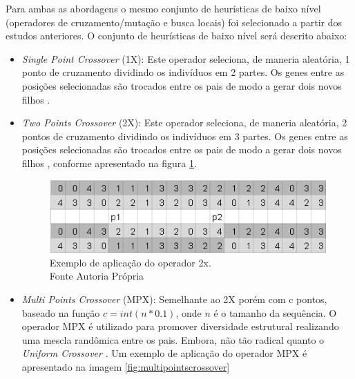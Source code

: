 Para ambas as abordagens o mesmo conjunto de heurísticas de baixo nível (operadores de cruzamento/mutação e busca locais) foi selecionado a partir dos estudos anteriores. O conjunto de heurísticas de baixo nível será descrito abaixo:

 \begin{itemize}
 	
 		\item \textit{Single Point Crossover} (1X): Este operador seleciona, de maneria aleatória, 1 ponto de cruzamento dividindo os indivíduos em 2 partes. Os genes entre as posições selecionadas são trocados entre os pais de modo a gerar dois novos filhos \cite{benitez2015algoritmo}.
 	
 	\item \textit{Two Points Crossover} (2X): Este operador seleciona, de maneria aleatória, 2 pontos de cruzamento dividindo os indivíduos em 3 partes. Os genes entre as posições selecionadas são trocados entre os pais de modo a gerar dois novos filhos \cite{benitez2015algoritmo}, conforme apresentado na figura \ref{fig:twopointscrossover}.
 	
 	
 	\begin{figure}[!htb]
 		\centering
 		\includegraphics{Imagens/TwoPointsCrossover.png}
 		\caption{Exemplo de aplicação do operador 2x. \\Fonte Autoria Própria}
 		\label{fig:twopointscrossover}
 	\end{figure}
 	
 	
 	
 	
 	\item \textit{Multi Points Crossover} (MPX): Semelhante ao 2X porém com c pontos, baseado na função $c = int(n * 0.1)$, onde $n$ é o tamanho da sequência. O operador MPX é utilizado para promover diversidade estrutural realizando uma mescla randômica entre os pais. Embora, não tão radical quanto o \textit{Uniform  Crossover} \cite{sabar2015automatic}. Um exemplo de aplicação do operador MPX é apresentado na imagem \ref{fig:multipointscrossover}
 	

\end{itemize}
